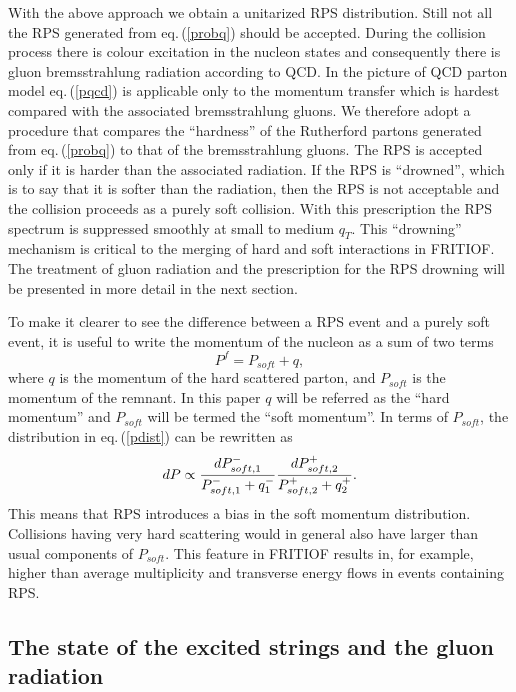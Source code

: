 With the above approach we obtain a unitarized RPS distribution.  Still not
all the RPS generated from eq.\,(\ref{probq}) should be accepted.  
During the collision process there is colour excitation in the nucleon
states and consequently there is gluon bremsstrahlung radiation according to QCD.
In the picture of QCD parton model eq.\,(\ref{pqcd}) is applicable only
to the momentum transfer which is hardest compared with the associated
bremsstrahlung gluons.  We therefore adopt a procedure that compares
the ``hardness'' of the Rutherford partons generated from eq.\,(\ref{probq}) 
to that of the bremsstrahlung gluons.  The RPS is accepted only if
it is harder than the associated radiation.  If the RPS is ``drowned'', 
which is to say that it is softer than the radiation, then the RPS is not
acceptable and the collision proceeds as a purely soft collision. 
With this prescription the RPS spectrum is suppressed smoothly at small
to medium $q_T$.  This ``drowning'' mechanism is critical to the merging 
of hard and soft interactions in FRITIOF.    
The treatment of gluon radiation and the prescription
for the RPS drowning will be presented in more detail in the next section.  

To make it clearer to see the difference between a RPS event and a purely
soft event, 
it is useful to write the momentum of the nucleon as a sum of two terms
\begin{equation}
\label{psoft}
P^f = P_{soft} + q,
\end{equation}
where $q$ is the momentum of the hard scattered parton, and  $P_{soft}$ is the momentum of the remnant.  In this paper $q$ will be referred as the
``hard momentum'' and $P_{soft}$ will be termed the ``soft momentum''.  
In terms of $P_{soft}$, the
distribution in eq.\,(\ref{pdist}) can be rewritten as
\begin{equation}
\label{pdists}
 dP \propto {{dP^-_{soft,1}}\over {P^-_{soft,1}+q_1^-}} 
            {{dP^+_{soft,2}}\over {P^+_{soft,2}+q_2^+}}. 
\end{equation}
This means that RPS introduces a bias in the soft momentum distribution.  Collisions having very hard scattering would in general also
have larger than usual components of $P_{soft}$.  This feature in FRITIOF
results in, for example, higher than average multiplicity and transverse
energy flows in events containing RPS.


\subsection{The state of the excited strings and the gluon radiation}

